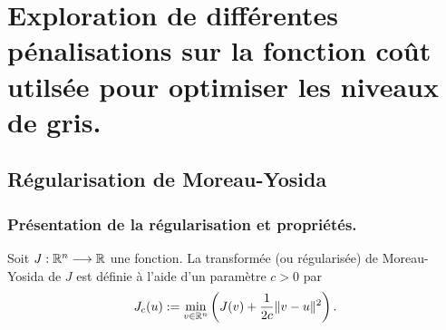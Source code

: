 \documentclass[main.tex]{subfiles}
\begin{document}
\chapter{Exploration de différentes pénalisations sur la fonction coût utilsée pour optimiser les niveaux de gris. \label{chap:anx_penalisation} }

\section{Régularisation de Moreau-Yosida}
\subsection{Présentation de la régularisation et propriétés.}
\begin{dfn}\label{dfn:moreau_yosida}
Soit $J : \mathbb{R}^n \longrightarrow \mathbb{R}$ une fonction. La transformée (ou régularisée) de Moreau-Yosida de $J$ est définie à l'aide d'un paramètre $c>0$ par
\begin{equation}
J_c(u) := \min_{v\in \mathbb{R}^n} \left( J(v) + \frac{1}{2c} \|v-u\|^2 \right).
\end{equation}
\end{dfn}
\end{document}
